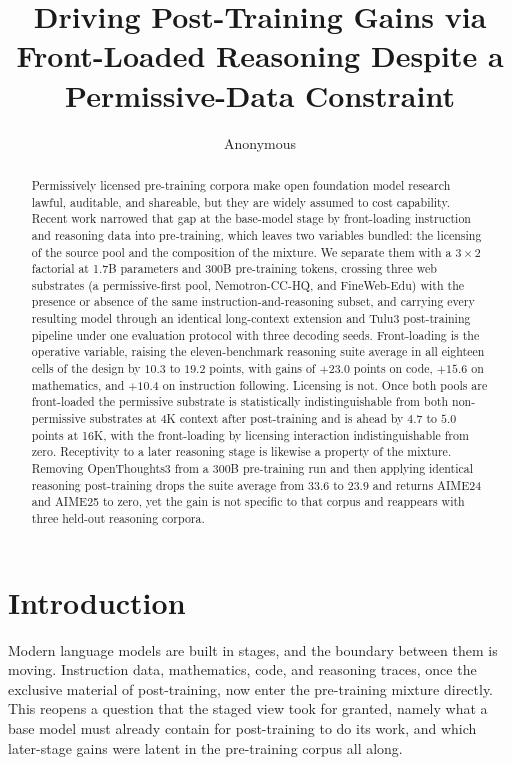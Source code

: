 \documentclass{article}
\title{Driving Post-Training Gains via Front-Loaded Reasoning Despite a Permissive-Data Constraint}
\author{%
  Anonymous
}
\begin{document}
\maketitle

\begin{abstract}
Permissively licensed pre-training corpora make open foundation model research lawful, auditable, and shareable, but they are widely assumed to cost capability. Recent work narrowed that gap at the base-model stage by front-loading instruction and reasoning data into pre-training, which leaves two variables bundled: the licensing of the source pool and the composition of the mixture. We separate them with a $3 \times 2$ factorial at 1.7B parameters and 300B pre-training tokens, crossing three web substrates (a permissive-first pool, Nemotron-CC-HQ, and FineWeb-Edu) with the presence or absence of the same instruction-and-reasoning subset, and carrying every resulting model through an identical long-context extension and Tulu3 post-training pipeline under one evaluation protocol with three decoding seeds. Front-loading is the operative variable, raising the eleven-benchmark reasoning suite average in all eighteen cells of the design by $10.3$ to $19.2$ points, with gains of $+23.0$ points on code, $+15.6$ on mathematics, and $+10.4$ on instruction following. Licensing is not. Once both pools are front-loaded the permissive substrate is statistically indistinguishable from both non-permissive substrates at 4K context after post-training and is ahead by $4.7$ to $5.0$ points at 16K, with the front-loading by licensing interaction indistinguishable from zero. Receptivity to a later reasoning stage is likewise a property of the mixture. Removing OpenThoughts3 from a 300B pre-training run and then applying identical reasoning post-training drops the suite average from $33.6$ to $23.9$ and returns AIME24 and AIME25 to zero, yet the gain is not specific to that corpus and reappears with three held-out reasoning corpora.
\end{abstract}


\section{Introduction}
\label{sec:intro}

Modern language models are built in stages, and the boundary between them is moving. Instruction data, mathematics, code, and reasoning traces, once the exclusive material of post-training, now enter the pre-training mixture directly. This reopens a question that the staged view took for granted, namely what a base model must already contain for post-training to do its work, and which later-stage gains were latent in the pre-training corpus all along.
\end{document}
